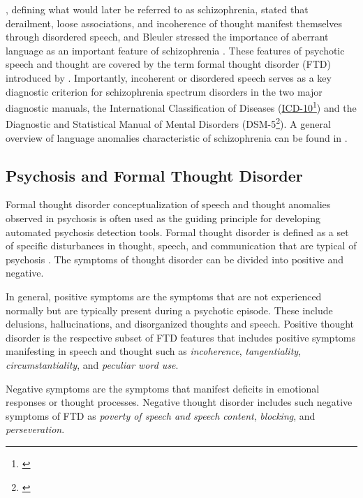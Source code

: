 \citet{kraepelin1919dementia}, defining what would later be referred to as schizophrenia, stated that derailment, loose associations, and incoherence of thought manifest themselves through disordered speech, and Bleuler stressed the importance of aberrant language as an important feature of schizophrenia \citep{bleuler1911dementia}. These features of psychotic speech and thought are covered by the term formal thought disorder (FTD) introduced by \citet{andreasen1986tlc}. Importantly, incoherent or disordered speech serves as a key diagnostic criterion for schizophrenia spectrum disorders in the two major diagnostic manuals, the International Classification of Diseases (\href{https://icd.who.int/browse10/2016/en#/F20-F29}{ICD-10}\footnote{\cite{world1992icd}}) and the Diagnostic and Statistical Manual of Mental Disorders (DSM-5\footnote{\cite{american2013dsm}}). A general overview of language anomalies characteristic of schizophrenia can be found in \citet{kuperberg2010language_a, kuperberg2010language_b, de2020anomalies}. 

\subsection{Psychosis and Formal Thought Disorder}

Formal thought disorder conceptualization of speech and thought anomalies observed in psychosis is often used as the guiding principle for developing automated psychosis detection tools. Formal thought disorder is defined as a set of specific disturbances in thought, speech, and communication that are typical of psychosis \citep{hart2017rethinking}. The symptoms of thought disorder can be divided into positive and negative. 

In general, positive symptoms are the symptoms that are not experienced normally but are typically present during a psychotic episode. These include delusions, hallucinations, and disorganized thoughts and speech. Positive thought disorder is the respective subset of FTD features that includes positive symptoms manifesting in speech and thought such as \textit{incoherence}, \textit{tangentiality}, \textit{circumstantiality}, and \textit{peculiar word use}. 

Negative symptoms are the symptoms that manifest deficits in emotional responses or thought processes. Negative thought disorder includes such negative symptoms of FTD as \textit{poverty of speech and speech content}, \textit{blocking}, and \textit{perseveration}.

